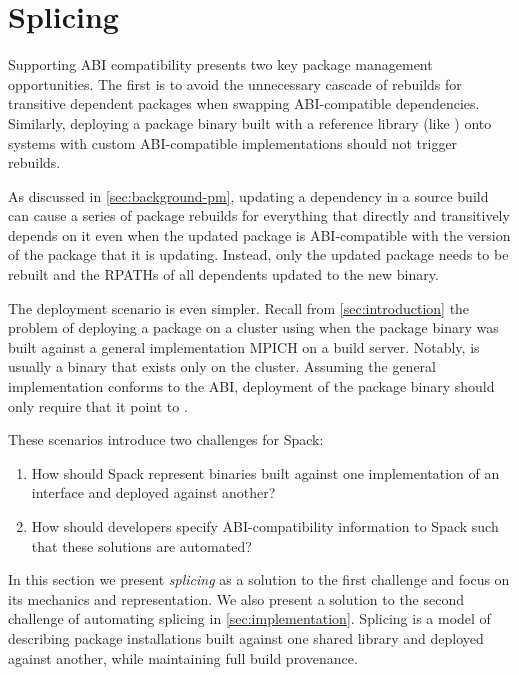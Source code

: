 \section{Splicing}

Supporting ABI compatibility presents two key package management opportunities.
The first is to avoid the unnecessary cascade of rebuilds for transitive
dependent packages when swapping ABI-compatible dependencies. Similarly,
deploying a package binary built with a reference library (like )
onto systems with custom ABI-compatible implementations should not trigger rebuilds.

As discussed in \cref{sec:background-pm}, updating a dependency in a source
build can cause a series of package rebuilds for everything that directly
and transitively depends on it even when the updated package is ABI-compatible
with the version of the package that it is updating.  Instead, only the updated
package needs to be rebuilt and the RPATHs of all dependents updated to the
new binary.

The deployment scenario is even simpler.
Recall from \cref{sec:introduction} the problem of deploying a package on a
cluster using  when the package binary was built against
a general implementation {MPICH} on a build server.
Notably,  is usually a binary that
exists only on the cluster.
Assuming the general implementation conforms to the  ABI,
deployment of the package binary should only require that it point to .

These scenarios introduce two challenges for Spack:
\begin{enumerate}
\item How should Spack represent binaries built against one
  implementation of an interface and deployed against another?
\item How should developers specify ABI-compatibility information to Spack such
  that these solutions are automated?
\end{enumerate}
In this section we present \textit{splicing} as a solution to the first
challenge and focus on its mechanics and representation. We also present a
solution to the second challenge of automating splicing in
\cref{sec:implementation}.  Splicing is a model of describing package
installations built against one shared library and deployed against
another, while maintaining full build provenance.

